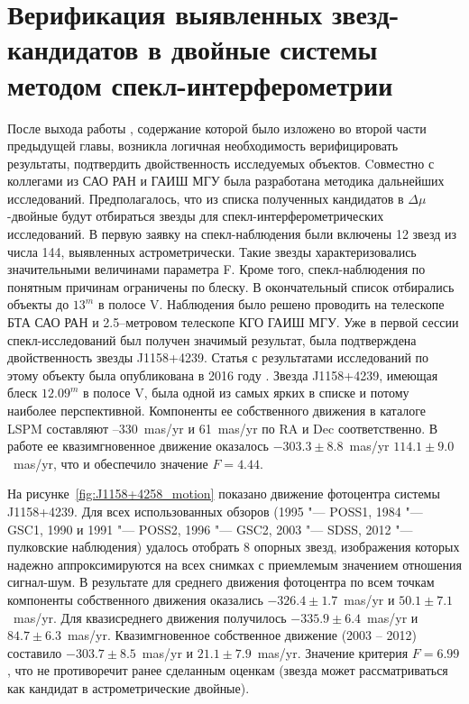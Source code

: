 \chapter{Верификация выявленных звезд-кандидатов в двойные системы методом спекл-интерферометрии} \label{ch:ch5}
После выхода работы \cite{2015AstL...41..833K}, содержание которой было изложено во второй части предыдущей главы, возникла логичная необходимость верифицировать результаты, подтвердить двойственность исследуемых объектов. Cовместно с коллегами из САО РАН и ГАИШ МГУ была разработана методика дальнейших исследований. Предполагалось, что из списка полученных кандидатов в $\Delta\mu$-двойные будут отбираться звезды для спекл-интерферометрических исследований.
В первую заявку на спекл-наблюдения были включены 12 звезд из числа 144, выявленных астрометрически. Такие звезды характеризовались значительными величинами параметра F. Кроме того, спекл-наблюдения по понятным причинам ограничены по блеску. В окончательный список отбирались объекты до $13^m$ в полосе V.
 Наблюдения было решено проводить на телескопе БТА САО РАН и 2.5--метровом телескопе КГО ГАИШ МГУ. Уже в первой сессии спекл-исследований был получен  значимый результат, была подтверждена двойственность звезды J1158+4239. Статья с результатами исследований по этому объекту была опубликована в 2016 году \cite{2016AstL...42..686K}.
Звезда J1158+4239, имеющая блеск $12.09^m$ в полосе V, была одной из самых ярких в списке и потому наиболее перспективной. Компоненты ее собственного движения в каталоге LSPM составляют --330~mas/yr и 61~mas/yr по RA и Dec соответственно. В работе \cite{2011AstL...37..420K} ее квазимгновенное движение оказалось  $-303.3\pm 8.8$~mas/yr   $114.1\pm9.0$~mas/yr, что и обеспечило значение $F = 4.44$.

На рисунке~\ref{fig:J1158+4258_motion} показано движение фотоцентра системы J1158+4239. Для всех использованных обзоров (1995 "--- POSS1, 1984 "--- GSC1, 1990 и 1991 "--- POSS2, 1996 "--- GSC2, 2003 "--- SDSS, 2012 "--- пулковские наблюдения) удалось отобрать 8 опорных звезд, изображения которых надежно аппроксимируются на всех снимках с приемлемым значением отношения сигнал-шум. В результате для среднего движения фотоцентра по всем точкам компоненты собственного движения оказались $-326.4\pm1.7$~mas/yr и $50.1\pm7.1$~mas/yr. Для квазисреднего движения получилось $-335.9\pm6.4$~mas/yr и   $84.7\pm6.3$~mas/yr. Квазимгновенное собственное движение (2003 -- 2012) составило $-303.7\pm8.5$~mas/yr    и   $21.1\pm7.9$~mas/yr. Значение критерия $F = 6.99$, что не противоречит ранее сделанным оценкам (звезда может рассматриваться как кандидат в астрометрические двойные).

